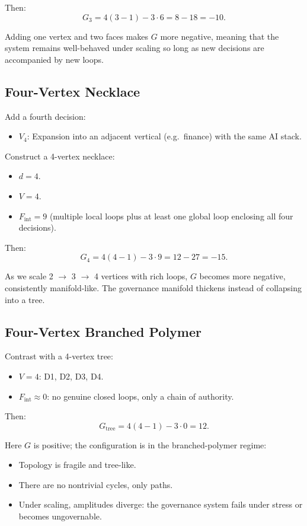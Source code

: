 \documentclass[11pt]{article}
\begin{document}
Then:
\[
G_{3} = 4(3 - 1) - 3\cdot 6 = 8 - 18 = -10.
\]

Adding one vertex and two faces makes \(G\) more negative, meaning that the system remains well-behaved under scaling so long as new decisions are accompanied by new loops.

\subsection{Four-Vertex Necklace}

Add a fourth decision:
\begin{itemize}
  \item \(V_4\): Expansion into an adjacent vertical (e.g.\ finance) with the same AI stack.
\end{itemize}

Construct a 4-vertex necklace:
\begin{itemize}
  \item \(d = 4\).
  \item \(V = 4\).
  \item \(F_{\text{int}} = 9\) (multiple local loops plus at least one global loop enclosing all four decisions).
\end{itemize}

Then:
\[
G_{4} = 4(4 - 1) - 3\cdot 9 = 12 - 27 = -15.
\]

As we scale 2 \(\to\) 3 \(\to\) 4 vertices with rich loops, \(G\) becomes more negative, consistently manifold-like. The governance manifold thickens instead of collapsing into a tree.

\subsection{Four-Vertex Branched Polymer}

Contrast with a 4-vertex tree:
\begin{itemize}
  \item \(V = 4\): D1, D2, D3, D4.
  \item \(F_{\text{int}} \approx 0\): no genuine closed loops, only a chain of authority.
\end{itemize}

Then:
\[
G_{\text{tree}} = 4(4 - 1) - 3\cdot 0 = 12.
\]

Here \(G\) is positive; the configuration is in the branched-polymer regime:
\begin{itemize}
  \item Topology is fragile and tree-like.
  \item There are no nontrivial cycles, only paths.
  \item Under scaling, amplitudes diverge: the governance system fails under stress or becomes ungovernable.
\end{itemize}
\end{document}
